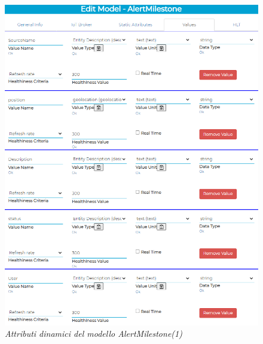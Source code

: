 \documentclass[a4paper, openright, thesis]{report}
\begin{document}
\begin{figure}[H]
    \centering
    \includegraphics[width=1\linewidth]{img/AlertMilestone3.png}
    \caption{\textit{ Attributi dinamici del modello AlertMilestone(1)}}
    \label{10}
\end{figure}
\end{document}
